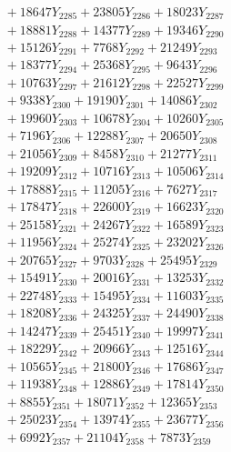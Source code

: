 \documentclass[a4paper,10pt]{article}
\begin{document}
{\begin{align}
&\;  + 18647 Y_{2285} + 23805 Y_{2286} + 18023 Y_{2287} \\[0.3ex]
&\;  + 18881 Y_{2288} + 14377 Y_{2289} + 19346 Y_{2290} \\[0.3ex]
&\;  + 15126 Y_{2291} + 7768 Y_{2292} + 21249 Y_{2293} \\[0.3ex]
&\;  + 18377 Y_{2294} + 25368 Y_{2295} + 9643 Y_{2296} \\[0.3ex]
&\;  + 10763 Y_{2297} + 21612 Y_{2298} + 22527 Y_{2299} \\[0.3ex]
&\;  + 9338 Y_{2300} + 19190 Y_{2301} + 14086 Y_{2302} \\[0.3ex]
&\;  + 19960 Y_{2303} + 10678 Y_{2304} + 10260 Y_{2305} \\[0.3ex]
&\;  + 7196 Y_{2306} + 12288 Y_{2307} + 20650 Y_{2308} \\[0.5ex]\allowbreak
&\;  + 21056 Y_{2309} + 8458 Y_{2310} + 21277 Y_{2311} \\[0.3ex]
&\;  + 19209 Y_{2312} + 10716 Y_{2313} + 10506 Y_{2314} \\[0.3ex]
&\;  + 17888 Y_{2315} + 11205 Y_{2316} + 7627 Y_{2317} \\[0.3ex]
&\;  + 17847 Y_{2318} + 22600 Y_{2319} + 16623 Y_{2320} \\[0.3ex]
&\;  + 25158 Y_{2321} + 24267 Y_{2322} + 16589 Y_{2323} \\[0.3ex]
&\;  + 11956 Y_{2324} + 25274 Y_{2325} + 23202 Y_{2326} \\[0.3ex]
&\;  + 20765 Y_{2327} + 9703 Y_{2328} + 25495 Y_{2329} \\[0.3ex]
&\;  + 15491 Y_{2330} + 20016 Y_{2331} + 13253 Y_{2332} \\[0.3ex]
&\;  + 22748 Y_{2333} + 15495 Y_{2334} + 11603 Y_{2335} \\[0.3ex]
&\;  + 18208 Y_{2336} + 24325 Y_{2337} + 24490 Y_{2338} \\[0.5ex]\allowbreak
&\;  + 14247 Y_{2339} + 25451 Y_{2340} + 19997 Y_{2341} \\[0.3ex]
&\;  + 18229 Y_{2342} + 20966 Y_{2343} + 12516 Y_{2344} \\[0.3ex]
&\;  + 10565 Y_{2345} + 21800 Y_{2346} + 17686 Y_{2347} \\[0.3ex]
&\;  + 11938 Y_{2348} + 12886 Y_{2349} + 17814 Y_{2350} \\[0.3ex]
&\;  + 8855 Y_{2351} + 18071 Y_{2352} + 12365 Y_{2353} \\[0.3ex]
&\;  + 25023 Y_{2354} + 13974 Y_{2355} + 23677 Y_{2356} \\[0.3ex]
&\;  + 6992 Y_{2357} + 21104 Y_{2358} + 7873 Y_{2359} \\[0.3ex]

\end{align}}
\end{document}

